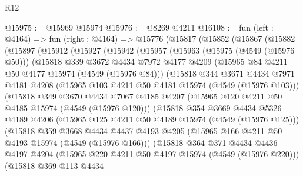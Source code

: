 \begin{lexlean}{R12}
\begin{coremodule}
@15975 := @15969 @15974
@15976 := @8269 @4211
@16108 := fun (left : @4164) =>
  fun (right : @4164) =>
  @15776
    (@15817
      (@15852
        (@15867
          (@15882
            (@15897
              (@15912
                (@15927
                  (@15942
                    (@15957
                      (@15963
                        (@15975 (@4549 (@15976 @50)))
                        (@15818
                          @339
                          @3672
                          @4434
                          @7972
                          @4177
                          @4209
                          (@15965 @84 @4211 @50 @4177 @15974 (@4549 (@15976 @84)))
                          (@15818
                            @344
                            @3671
                            @4434
                            @7971
                            @4181
                            @4208
                            (@15965 @103 @4211 @50 @4181 @15974 (@4549 (@15976 @103)))
                            (@15818
                              @349
                              @3670
                              @4434
                              @7067
                              @4185
                              @4207
                              (@15965 @120 @4211 @50 @4185 @15974 (@4549 (@15976 @120)))
                              (@15818
                                @354
                                @3669
                                @4434
                                @5326
                                @4189
                                @4206
                                (@15965 @125 @4211 @50 @4189 @15974 (@4549 (@15976 @125)))
                                (@15818
                                  @359
                                  @3668
                                  @4434
                                  @4437
                                  @4193
                                  @4205
                                  (@15965 @166 @4211 @50 @4193 @15974 (@4549 (@15976 @166)))
                                  (@15818
                                    @364
                                    @371
                                    @4434
                                    @4436
                                    @4197
                                    @4204
                                    (@15965 @220 @4211 @50 @4197 @15974 (@4549 (@15976 @220)))
                                    (@15818
                                      @369
                                      @113
                                      @4434

\end{coremodule}
\end{lexlean}
